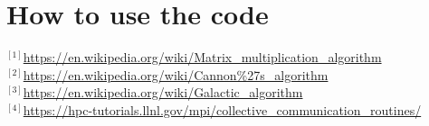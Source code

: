 \documentclass[12pt]{article}
\begin{document}
	\section{How to use the code}
	
	
	\newpage
	
	
	
	$^{[1]}$\url{https://en.wikipedia.org/wiki/Matrix_multiplication_algorithm}\\
	$^{[2]}$\url{https://en.wikipedia.org/wiki/Cannon%27s_algorithm}\\
	$^{[3]}$\url{https://en.wikipedia.org/wiki/Galactic_algorithm}\\
	$^{[4]}$\url{https://hpc-tutorials.llnl.gov/mpi/collective_communication_routines/}\\
	
	
	
\end{document}
